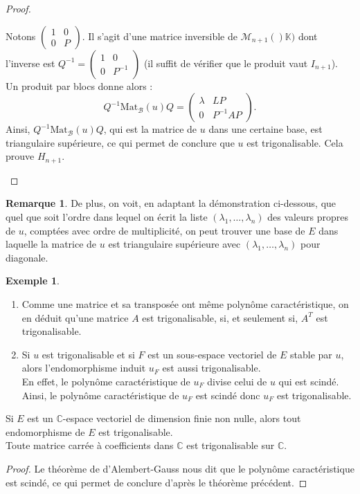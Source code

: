 \documentclass[french]{article}
\newcommand{\C}{\mathbb{C}}
\newcommand{\K}{\mathbb{K}}
\newcommand{\inv}{^{-1}}
\theoremstyle{plain}
\theoremstyle{definition}
\newtheorem*{ex}{Exemple}
\newtheorem*{rmq}{Remarque}
\theoremstyle{remark}
\begin{document}
\begin{proof}
\begin{itemize}
			Notons $\begin{pmatrix}
				1&0\\
				0&P
			\end{pmatrix}$. Il s'agit d'une matrice inversible de $\mathcal{M}_{n+1}()\K)$ dont l'inverse est $Q\inv=\begin{pmatrix}
				1&0\\
				0&P\inv
			\end{pmatrix}$ (il suffit de vérifier que le produit vaut $I_{n+1}$).\\
			Un produit par blocs donne alors : $$Q\inv\text{Mat}_\mathcal{B}(u)Q=\begin{pmatrix}
				\lambda&LP\\
				0&P\inv AP
			\end{pmatrix}.$$ Ainsi, $Q\inv\text{Mat}_\mathcal{B}(u)Q$, qui est la matrice de $u$ dans une certaine base, est triangulaire supérieure, ce qui permet de conclure que $u$ est trigonalisable. Cela prouve $H_{n+1}$.
		\end{itemize}
	\end{proof}
	
	\begin{rmq}
		De plus, on voit, en adaptant la démonstration ci-dessous, que quel que soit l'ordre dans lequel on écrit la liste $(\lambda_1,\ldots,\lambda_n)$ des valeurs propres de $u$, comptées avec ordre de multiplicité, on peut trouver une base de $E$ dans laquelle la matrice de $u$ est triangulaire supérieure avec $(\lambda_1,\ldots,\lambda_n)$ pour diagonale.
	\end{rmq}
	
	\begin{ex}
		\begin{enumerate}
			\item Comme une matrice et sa transposée ont même polynôme caractéristique, on en déduit qu'une matrice $A$ est trigonalisable, si, et seulement si, $A^T$ est trigonalisable.
			\item Si $u$ est trigonalisable et si $F$ est un sous-espace vectoriel de $E$ stable par $u$, alors l'endomorphisme induit $u_F$ est aussi trigonalisable.\\
			En effet, le polynôme caractéristique de $u_F$ divise celui de $u$ qui est scindé. Ainsi, le polynôme caractéristique de $u_F$ est scindé donc $u_F$ est trigonalisable.
		\end{enumerate}
	\end{ex}
	
	\begin{cor}%
		Si $E$ est un $\C$-espace vectoriel de dimension finie non nulle, alors tout endomorphisme de $E$ est trigonalisable. \\
		Toute matrice carrée à coefficients dans $\C$ est trigonalisable sur $\C$.
	\end{cor}
	\begin{proof}
		Le théorème de d'Alembert-Gauss nous dit que le polynôme caractéristique est scindé, ce qui permet de conclure d'après le théorème précédent.
	\end{proof}
	
\end{document}
